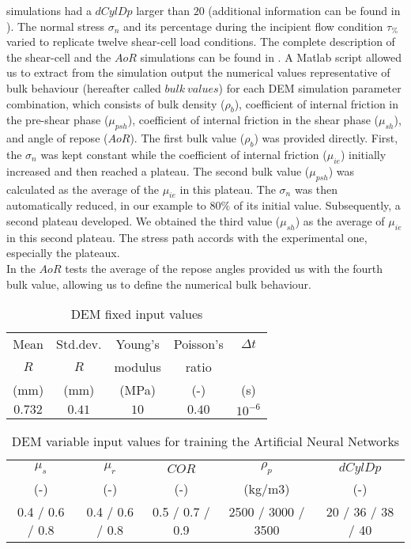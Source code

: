\documentclass{CFD2015}
\begin{document}
simulations had a $dCylDp$ larger than $20$ (additional information can be found
in \citet{RefWorks:180}).
The normal stress $\sigma_n$ and its
percentage during the incipient flow condition $\tau_{\%}$
varied to replicate twelve shear-cell load conditions. 
The complete description of the shear-cell 
and the $AoR$ simulations
can be found in \citet{RefWorks:180}.
A Matlab script allowed us to extract from the simulation output the numerical
values representative of bulk behaviour (hereafter called $bulk ~ values$)
for each DEM simulation parameter combination, which consists of
bulk density ($\rho_b$),
coefficient of internal friction in the pre-shear phase ($\mu_{psh}$),
coefficient of internal friction in the shear phase ($\mu_{sh}$),
and angle of repose ($AoR$).
The first bulk value ($\rho_b$) was provided directly. 
First, the $\sigma_n$ was kept constant while the coefficient of internal
friction ($\mu_{ie}$) initially increased and then reached a plateau.
The second bulk value ($\mu_{psh}$) was calculated as the average of the
$\mu_{ie}$ in this plateau.
The $\sigma_n$ was then automatically reduced, in our example to $80 \%$ of
its initial value.
Subsequently, a second plateau developed.
We obtained the third
value ($\mu_{sh}$) as the average of $\mu_{ie}$ in this second plateau.
The stress path accords with the experimental one, especially the plateaux.\\
In the $AoR$ tests the average of the repose angles provided us with the fourth
bulk value, allowing us to define the numerical bulk behaviour.
\begin{table}%
\centering
\begin{tabular}{ccccc}
\hline
    Mean & Std.dev.  & Young's & Poisson's & $\Delta t$\\
    $R$ & $R$ & modulus & ratio & \\
    (mm)  & (mm)  & (MPa) & (-) & (s)\\
    \hline
    $0.732$ & $0.41$ & $10$    & $0.40$ & $10^{-6}$\\
\hline
\end{tabular}
\caption{DEM fixed input values}
\label{tab:09DEMFixedinputvalues}
\end{table}
\begin{table*}%
\centering
\begin{tabular}{ccccc}
\hline
    $\mu_s$ & $\mu_r$ & $COR$ & $\rho_p$ & $dCylDp$ \\
    	(-)  & (-)   & (-)   & (kg/m3) & (-) \\
    \hline
    0.4 / 0.6 / 0.8 & 0.4 / 0.6 / 0.8 & 0.5 / 0.7 / 0.9 & 2500 / 3000 / 3500 & 20 / 36 / 38 / 40 \\

\hline
\end{tabular}
\caption[DEM variable input values]{DEM variable input values for training the
Artificial Neural Networks}
\label{tab:10DEMVariableinputvalues}
\end{table*}
\end{document}
